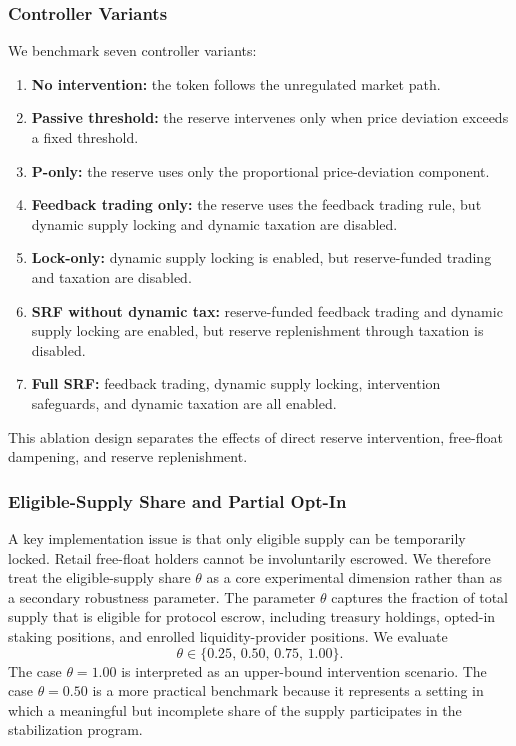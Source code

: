 \documentclass[a4paper,fleqn]{cas-dc}
\begin{document}
\subsubsection{Controller Variants}

We benchmark seven controller variants:

\begin{enumerate}
    \item \textbf{No intervention:} the token follows the unregulated market path.
    \item \textbf{Passive threshold:} the reserve intervenes only when price deviation exceeds a fixed threshold.
    \item \textbf{P-only:} the reserve uses only the proportional price-deviation component.
    \item \textbf{Feedback trading only:} the reserve uses the feedback trading rule, but dynamic supply locking and dynamic taxation are disabled.
    \item \textbf{Lock-only:} dynamic supply locking is enabled, but reserve-funded trading and taxation are disabled.
    \item \textbf{SRF without dynamic tax:} reserve-funded feedback trading and dynamic supply locking are enabled, but reserve replenishment through taxation is disabled.
    \item \textbf{Full SRF:} feedback trading, dynamic supply locking, intervention safeguards, and dynamic taxation are all enabled.
\end{enumerate}

This ablation design separates the effects of direct reserve intervention, free-float dampening, and reserve replenishment.

\subsubsection{Eligible-Supply Share and Partial Opt-In}

A key implementation issue is that only eligible supply can be temporarily locked. Retail free-float holders cannot be involuntarily escrowed. We therefore treat the eligible-supply share \(\theta\) as a core experimental dimension rather than as a secondary robustness parameter. The parameter \(\theta\) captures the fraction of total supply that is eligible for protocol escrow, including treasury holdings, opted-in staking positions, and enrolled liquidity-provider positions. We evaluate
\[
\theta \in \{0.25,\,0.50,\,0.75,\,1.00\}.
\]
The case \(\theta=1.00\) is interpreted as an upper-bound intervention scenario. The case \(\theta=0.50\) is a more practical benchmark because it represents a setting in which a meaningful but incomplete share of the supply participates in the stabilization program.
\end{document}
